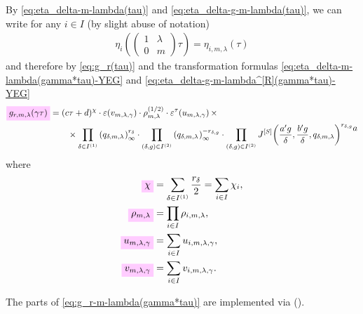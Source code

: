 \documentclass{article}
\begin{document}
By \eqref{eq:eta_delta-m-lambda(tau)} and
\eqref{eq:eta_delta-g-m-lambda(tau)}, we can write for any $i\in I$
(by slight abuse of notation)
\begin{gather}
  \eta_i\!\left(
    \begin{pmatrix}1& \lambda\\0&m\end{pmatrix}
    \tau \right)
  =
  \eta_{i,m,\lambda}(\tau)
\end{gather}
and therefore by \eqref{eq:g_r(tau)} and the transformation formulas
\eqref{eq:eta_delta-m-lambda(gamma*tau)-YEG} and
\eqref{eq:eta_delta-g-m-lambda^[R](gamma*tau)-YEG}
\begin{align}
  \begin{split}
  \defineNotation[g-r-m-lambda-gamma-tau]{g_{r,m,\lambda}(\gamma\tau)}
  &=
    (c\tau+d)^{\chi} \cdot
    \unityPower{v_{m,\lambda,\gamma}}
    \cdot
    \rho_{m,\lambda}^{(1/2)}
    \cdot
    \unityPowerTau{u_{m,\lambda,\gamma}}
    \times
    \\
    & \qquad\times
    \prod_{\delta\in I^{(1)}}
    \eulerFunction[q_{\delta,m,\lambda}]{}^{r_\delta}
    \cdot
    \prod_{(\delta,g)\in I^{(2)}}
    \eulerFunction[q_{\delta,m,\lambda}]{}^{-r_{\delta,g}}
    \cdot
    \prod_{(\delta,g)\in I^{(2)}}
    \jacobiSchoeneberg{\frac{a' g}{\delta}}{\frac{b' g}{\delta}}{q_{\delta,m,\lambda}}^{r_{\delta,g}}
  \end{split}
  \label{eq:g_r-m-lambda(gamma*tau)}
a\end{align}
where
\begin{align}
  \defineNotation[chi]{\chi}
  &=
    \sum_{\delta\in I^{(1)}} \frac{r_\delta}{2}
    =
    \sum_{i\in I} \chi_i,
    \label{eq:g_r-m-lambda(gamma*tau)-cdExponent}
  \\
  \defineNotation[rho-m-lambda]{\rho_{m,\lambda}}
  &=
    \prod_{i\in I} \rho_{i,m,\lambda},
    \label{eq:g_r-m-lambda(gamma*tau)-rationalPrefactor}
  \\
  \defineNotation[u-m-lambda-gamma]{u_{m,\lambda,\gamma}}
  &=
    \sum_{i\in I} u_{i,m,\lambda,\gamma},
    \label{eq:g_r-m-lambda(gamma*tau)-qExponent}
  \\
  \defineNotation[v-m-lambda-gamma]{v_{m,\lambda,\gamma}}
  &=
    \sum_{i\in I} v_{i,m,\lambda,\gamma}.
    \label{eq:g_r-m-lambda(gamma*tau)-unityExponent}
\end{align}







The parts of \eqref{eq:g_r-m-lambda(gamma*tau)} are implemented via
\textcolor{blue}{}
().
\end{document}
